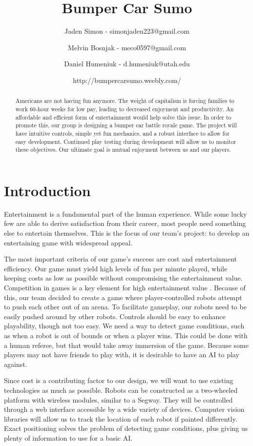 \documentclass[11pt]{ieeeconf}
\title{Bumper Car Sumo}
\author{Jaden Simon - simonjaden223@gmail.com \\ \and
	   Melvin Bosnjak - meco0597@gmail.com \\ \and
	   Daniel Humeniuk - d.humeniuk@utah.edu \\ \and
	   http://bumpercarsumo.weebly.com/}
\begin{document}
\maketitle

\begin{abstract}
Americans are not having fun anymore. The weight of capitalism is forcing families to work 60-hour weeks for low pay, leading to decreased enjoyment and productivity. An affordable and efficient form of entertainment would help solve this issue. In order to promote this, our group is designing a bumper car battle royale game. The project will have intuitive controls, simple yet fun mechanics, and a robust interface to allow for easy development. Continued play testing during development will allow us to monitor these objectives. Our ultimate goal is mutual enjoyment between us and our players.
\end{abstract}

\section{Introduction}
Entertainment is a fundamental part of the human experience. While some lucky few are able to derive satisfaction from their career, most people need something else to entertain themselves. This is the focus of our team's project: to develop an entertaining game with widespread appeal.

 The most important criteria of our game’s success are cost and entertainment efficiency. Our game must yield high levels of fun per minute played, while keeping costs as low as possible without compromising the entertainment value. Competition in games is a key element for high entertainment value \cite{vord:03}.  Because of this, our team decided to create a game where player-controlled robots attempt to push each other out of an arena. To facilitate gameplay, our robots need to be easily pushed around by other robots. Controls should be easy to enhance playability, though not too easy. We need a way to detect game conditions, such as when a robot is out of bounds or when a player wins. This could be done with a human referee, but that would take away immersion of the game. Because some players may not have friends to play with, it is desirable to have an AI to play against. 

Since cost is a contributing factor to our design, we will want to use existing technologies as much as possible. Robots can be constructed as a two-wheeled platform with wireless modules, similar to a Segway. They will be controlled through a web interface accessible by a wide variety of devices. Computer vision libraries will allow us to track the location of each robot if painted differently. Exact positioning solves the problem of detecting game conditions, plus giving us plenty of information to use for a basic AI. 
\end{document}
